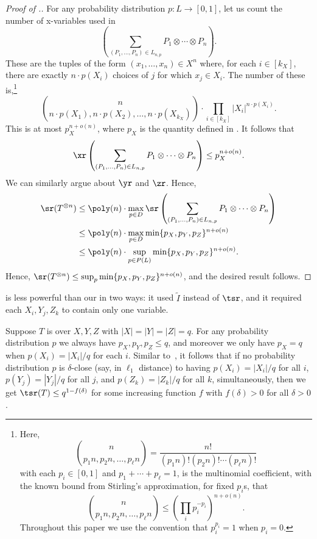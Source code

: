 \documentclass{toc}
\begin{document}
\begin{proof}[Proof of .]
For any probability distribution $p : L \to [0,1]$, let us count the number of x-variables used in
\[
  \left( \sum_{(P_1, \ldots, P_n) \in L_{n,p}}P_1 \otimes \cdots \otimes P_n \right).
\]
These are the tuples of the form $(x_1, \ldots, x_n) \in X^n$ where, for each $i \in [k_X]$, there are exactly $n \cdot p(X_i)$ choices of $j$ for which $x_j \in X_i$. The number of these is,\footnote{Here, \[
    \binom{n}{p_1 n, p_2 n, \ldots, p_\ell n } = \frac{n!}{(p_1 n)! (p_2 n)! \cdots (p_\ell n)!}
  \]
  with each $p_i \in [0,1]$ and $p_1 + \cdots + p_\ell = 1$, is the multinomial coefficient, with the known bound from Stirling's approximation, for fixed $p_i$s, that
  \[
    \binom{n}{p_1 n, p_2 n, \ldots, p_\ell n} \leq  \left( \prod_i p_i^{- p_i} \right)^{n + o(n)}.
  \]
  Throughout this paper we use the convention that $p_i^{p_i} = 1$ when $p_i = 0$.}
$$\binom{n}{n \cdot p(X_1), n \cdot p(X_2), \ldots, n \cdot p(X_{k_X})} \cdot \prod_{i \in [k_X]} |X_i|^{n \cdot p(X_i)}.$$
This is
%
at most  %
$p_X^{n + o(n)}$, where $p_X$ is the quantity defined in . It follows that
\[
  \xr \left( \sum_{(P_1, \ldots, P_n) \in L_{n,p}}P_1 \otimes \cdots \otimes P_n \right) \leq p_X^{n + o(n)}.
\]
We can similarly argue about $\yr$ and $\zr$. Hence,
\begin{align*}
    \sr(T^{\otimes n}) &\leq \poly(n) \cdot \max_{p \in D} \sr\left( \sum_{(P_1, \ldots, P_n) \in L_{n,p}}P_1 \otimes \cdots \otimes P_n \right) \\ &\leq \poly(n) \cdot \max_{p \in D} \min\{ p_X, p_Y, p_Z\}^{n + o(n)} \\ &\leq \poly(n) \cdot \sup_{p \in P(L)} \min\{ p_X, p_Y, p_Z\}^{n + o(n)}.
\end{align*}
Hence, $\sr(T^{\otimes n}) \leq \sup_{p} \min\{ p_X, p_Y, p_Z\}^{n + o(n)}$, and the desired result follows.
\end{proof}

\begin{remark}
\cite[Theorem~5.2]{aw} is less powerful than our  in two ways: it used $\tilde{I}$ instead of $\tsr$, and it required each $X_i, Y_j, Z_k$ to contain only one variable.
\end{remark}

\begin{remark}
Suppose $T$ is over $X,Y,Z$ with $|X|=|Y|=|Z|=q$. For any probability distribution $p$ we always have $p_X, p_Y, p_Z \leq q$, and moreover we only have $p_X = q$ when $p(X_i) = |X_i|/q$ for each $i$. Similar to~\cite[Corollary~5.1]{aw}, it follows that if no probability distribution $p$ is $\delta$-close (say, in $\ell_1$ distance) to having $p(X_i) = |X_i|/q$ for all $i$, $p(Y_j) = |Y_j|/q$ for all $j$, and $p(Z_k) = |Z_k|/q$ for all $k$, simultaneously, then we get $\tsr(T) \leq q^{1 - f(\delta)}$ for some increasing function $f$ with $f(\delta)>0$ for all $\delta>0$. 
\end{remark}
\end{document}
